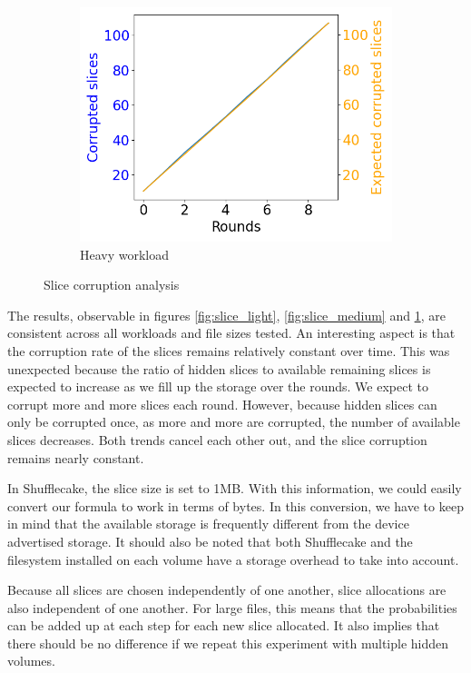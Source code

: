 \documentclass[a4paper,11pt,oneside]{report}
\begin{document}
\begin{figure}[ht]
\begin{subfigure}[b]{0.3\textwidth}
         \centering
         \includegraphics[width=\textwidth]{Figures/corruption_rate3MB.png}
         \caption{Heavy workload}
         \label{fig:slice_heavy}
     \end{subfigure}
        \caption{Slice corruption analysis}
        \label{fig:slice_analysis}
\end{figure}

The results, observable in figures \ref{fig:slice_light}, \ref{fig:slice_medium} and \ref{fig:slice_heavy}, are consistent across all workloads and file sizes tested. An interesting aspect is that the corruption rate of the slices remains relatively constant over time. This was unexpected because the ratio of hidden slices to available remaining slices is expected to increase as we fill up the storage over the rounds. We expect to corrupt more and more slices each round. However, because hidden slices can only be corrupted once, as more and more are corrupted, the number of available slices decreases. Both trends cancel each other out, and the slice corruption remains nearly constant.

In Shufflecake, the slice size is set to 1MB. With this information, we could easily convert our formula to work in terms of bytes. In this conversion, we have to keep in mind that the available storage is frequently different from the device advertised storage. It should also be noted that both Shufflecake and the filesystem installed on each volume have a storage overhead to take into account.

Because all slices are chosen independently of one another, slice allocations are also independent of one another. For large files, this means that the probabilities can be added up at each step for each new slice allocated. It also implies that there should be no difference if we repeat this experiment with multiple hidden volumes.
\end{document}
